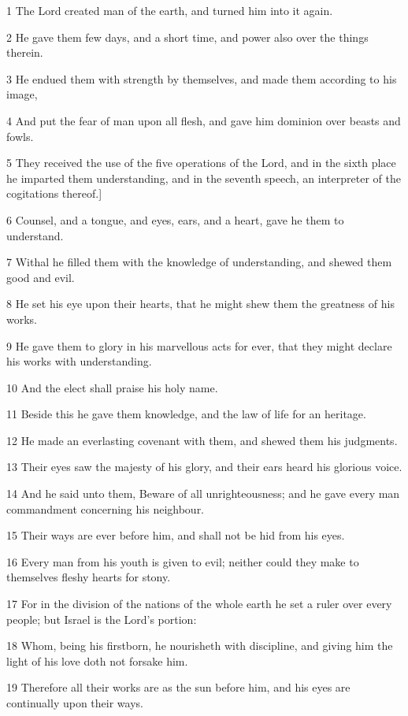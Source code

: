 \par 1 The Lord created man of the earth, and turned him into it again.
\par 2 He gave them few days, and a short time, and power also over the things therein.
\par 3 He endued them with strength by themselves, and made them according to his image,
\par 4 And put the fear of man upon all flesh, and gave him dominion over beasts and fowls.
\par 5 They received the use of the five operations of the Lord, and in the sixth place he imparted them understanding, and in the seventh speech, an interpreter of the cogitations thereof.]
\par 6 Counsel, and a tongue, and eyes, ears, and a heart, gave he them to understand.
\par 7 Withal he filled them with the knowledge of understanding, and shewed them good and evil.
\par 8 He set his eye upon their hearts, that he might shew them the greatness of his works.
\par 9 He gave them to glory in his marvellous acts for ever, that they might declare his works with understanding.
\par 10 And the elect shall praise his holy name.
\par 11 Beside this he gave them knowledge, and the law of life for an heritage.
\par 12 He made an everlasting covenant with them, and shewed them his judgments.
\par 13 Their eyes saw the majesty of his glory, and their ears heard his glorious voice.
\par 14 And he said unto them, Beware of all unrighteousness; and he gave every man commandment concerning his neighbour.
\par 15 Their ways are ever before him, and shall not be hid from his eyes.
\par 16 Every man from his youth is given to evil; neither could they make to themselves fleshy hearts for stony.
\par 17 For in the division of the nations of the whole earth he set a ruler over every people; but Israel is the Lord's portion:
\par 18 Whom, being his firstborn, he nourisheth with discipline, and giving him the light of his love doth not forsake him.
\par 19 Therefore all their works are as the sun before him, and his eyes are continually upon their ways.
